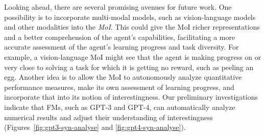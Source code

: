 \documentclass{article} %
\begin{document}

Looking ahead, there are several promising avenues for future work. One possibility is to incorporate multi-modal models, such as vision-language models and other modalities into the \emph{MoI}. This could give the MoI richer representations and a better comprehension of the agent's capabilities, facilitating a more accurate assessment of the agent's learning progress and task diversity. For example, a vision-language MoI might see that the agent is making progress on or very close to solving a task for which it is getting no reward, such as peeling an egg. 
Another idea is to allow the MoI to autonomously analyze quantitative performance measures, make its own assessment of learning progress, and incorporate that into its notion of interestingness. Our preliminary investigations indicate that FMs, such as GPT-3 and GPT-4, can automatically analyze numerical results and adjust their understanding of interestingness (Figures~\ref{fig:gpt3-syn-analyse} and \ref{fig:gpt4-syn-analyse}).
\end{document}
